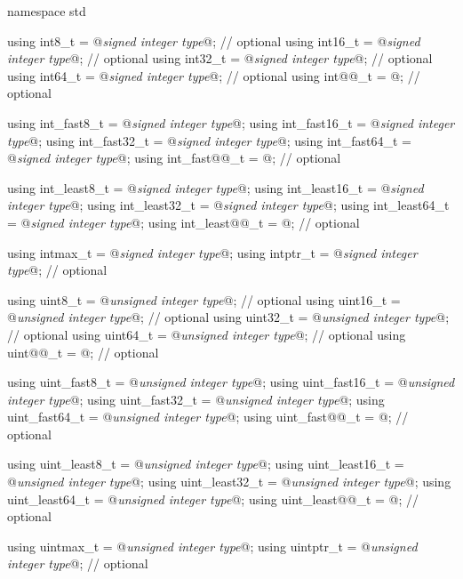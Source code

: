 \begin{codeblock}
namespace std {
  using int8_t         = @\textit{signed integer type}@;   // optional
  using int16_t        = @\textit{signed integer type}@;   // optional
  using int32_t        = @\textit{signed integer type}@;   // optional
  using int64_t        = @\textit{signed integer type}@;   // optional
  using int@@_t         = @\seebelow@;             // optional

  using int_fast8_t    = @\textit{signed integer type}@;
  using int_fast16_t   = @\textit{signed integer type}@;
  using int_fast32_t   = @\textit{signed integer type}@;
  using int_fast64_t   = @\textit{signed integer type}@;
  using int_fast@@_t    = @\seebelow@;             // optional

  using int_least8_t   = @\textit{signed integer type}@;
  using int_least16_t  = @\textit{signed integer type}@;
  using int_least32_t  = @\textit{signed integer type}@;
  using int_least64_t  = @\textit{signed integer type}@;
  using int_least@@_t   = @\seebelow@;             // optional

  using intmax_t       = @\textit{signed integer type}@;
  using intptr_t       = @\textit{signed integer type}@;   // optional

  using uint8_t        = @\textit{unsigned integer type}@; // optional
  using uint16_t       = @\textit{unsigned integer type}@; // optional
  using uint32_t       = @\textit{unsigned integer type}@; // optional
  using uint64_t       = @\textit{unsigned integer type}@; // optional
  using uint@@_t        = @\seebelow@;             // optional

  using uint_fast8_t   = @\textit{unsigned integer type}@;
  using uint_fast16_t  = @\textit{unsigned integer type}@;
  using uint_fast32_t  = @\textit{unsigned integer type}@;
  using uint_fast64_t  = @\textit{unsigned integer type}@;
  using uint_fast@@_t   = @\seebelow@;             // optional

  using uint_least8_t  = @\textit{unsigned integer type}@;
  using uint_least16_t = @\textit{unsigned integer type}@;
  using uint_least32_t = @\textit{unsigned integer type}@;
  using uint_least64_t = @\textit{unsigned integer type}@;
  using uint_least@@_t  = @\seebelow@;             // optional

  using uintmax_t      = @\textit{unsigned integer type}@;
  using uintptr_t      = @\textit{unsigned integer type}@; // optional
}


\end{codeblock}
